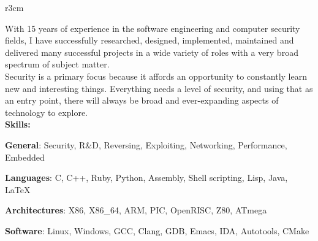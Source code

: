 \documentclass[]{SBResume}
\begin{document}
\makeheader


\begin{resume}
  
  \begin{resumetext}
    \begin{wrapfigure}{r}{3cm}
    \insertheadshot
    \end{wrapfigure}
    With 15 years of experience in the software engineering and
    computer security fields, I have successfully researched,
    designed, implemented, maintained and delivered many successful
    projects in a wide variety of roles with a very broad spectrum of
    subject matter.\\
    
    Security is a primary focus because it affords an opportunity to
    constantly learn new and interesting things. Everything needs a
    level of security, and using that as an entry point, there will
    always be broad and ever-expanding aspects of technology to
    explore.\\
    
    \textbf{Skills:}
    \begin{resumeitemize2}
    \item{\textbf{General}: Security, R\&D, Reversing, Exploiting, Networking, Performance, Embedded}
    \item{\textbf{Languages}: C, C++, Ruby, Python, Assembly, Shell scripting, Lisp, Java, \LaTeX}
    \item{\textbf{Architectures}: X86, X86\_64, ARM, PIC, OpenRISC, Z80, ATmega }
    \item{\textbf{Software}: Linux, Windows, GCC, Clang, GDB, Emacs, IDA, Autotools, CMake}
    \end{resumeitemize2}
    



\end{resumetext}
\end{resume}
\end{document}
